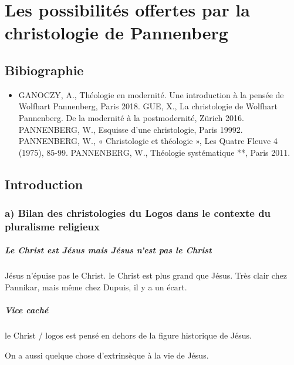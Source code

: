 \chapter{
Les possibilités offertes par la christologie de Pannenberg}



 

\section{Bibiographie}
\begin{itemize}
    \item GANOCZY, A., Théologie en modernité. Une introduction à la pensée de Wolfhart
Pannenberg, Paris 2018.
GUE, X., La christologie de Wolfhart Pannenberg. De la modernité à la postmodernité,
Zürich 2016.
PANNENBERG, W., Esquisse d’une christologie, Paris 19992.
PANNENBERG, W., « Christologie et théologie », Les Quatre Fleuve 4 (1975), 85-99.
PANNENBERG, W., Théologie systématique **, Paris 2011.
\end{itemize}



\section{Introduction}


\subsection{a) Bilan des christologies du Logos dans le contexte du pluralisme religieux}

\paragraph{Le Christ est Jésus mais Jésus n'est pas le Christ} Jésus n'épuise pas le Christ. le Christ est plus grand que Jésus. Très clair chez Pannikar, mais même chez Dupuis, il y a un écart.

\paragraph{Vice caché} le Christ / logos est pensé en dehors de la figure historique de Jésus. 
\begin{Ex}
On a aussi quelque chose d'extrinsèque à la vie de Jésus. 
\end{Ex}

